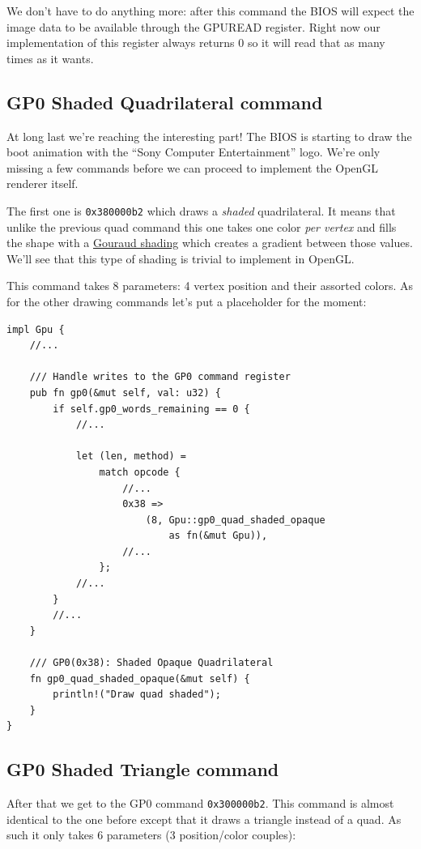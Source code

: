 \documentclass[a4paper]{article}
\newcommand{\code}[1] {\texttt{#1}}
\begin{document}
We don't have to do anything more: after this command the BIOS will
expect the image data to be available through the GPUREAD
register. Right now our implementation of this register always returns
0 so it will read that as many times as it wants.

\subsection{GP0 Shaded Quadrilateral command}

At long last we're reaching the interesting part! The BIOS is starting
to draw the boot animation with the ``Sony Computer Entertainment''
logo. We're only missing a few commands before we can proceed to
implement the OpenGL renderer itself.

The first one is \code{0x380000b2} which draws a \emph{shaded}
quadrilateral. It means that unlike the previous quad command this one
takes one color \emph{per vertex} and fills the shape with a
\href{https://en.wikipedia.org/wiki/Gouraud_shading}{Gouraud shading}
which creates a gradient between those values. We'll see that this
type of shading is trivial to implement in OpenGL.

This command takes 8 parameters: 4 vertex position and their assorted
colors. As for the other drawing commands let's put a placeholder for
the moment:

\begin{lstlisting}
impl Gpu {
    //...

    /// Handle writes to the GP0 command register
    pub fn gp0(&mut self, val: u32) {
        if self.gp0_words_remaining == 0 {
            //...

            let (len, method) =
                match opcode {
                    //...
                    0x38 =>
                        (8, Gpu::gp0_quad_shaded_opaque
                            as fn(&mut Gpu)),
                    //...
                };
            //...
        }
        //...
    }

    /// GP0(0x38): Shaded Opaque Quadrilateral
    fn gp0_quad_shaded_opaque(&mut self) {
        println!("Draw quad shaded");
    }
}
\end{lstlisting}

\subsection{GP0 Shaded Triangle command}

After that we get to the GP0 command \code{0x300000b2}. This command
is almost identical to the one before except that it draws a triangle
instead of a quad. As such it only takes 6 parameters (3
position/color couples):
\end{document}
